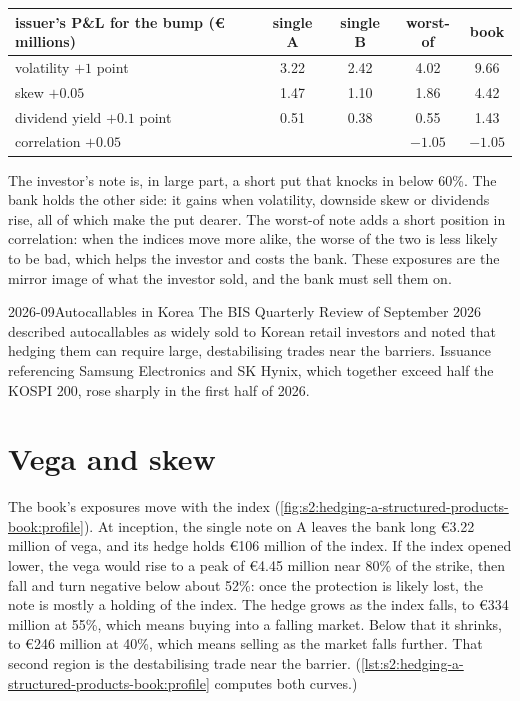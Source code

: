\begin{center}
\small
\begin{tabular}{@{}lcccc@{}}
\toprule
issuer's P\&L for the bump (\euro{} millions) & single A & single B & worst-of & book\\
\midrule
volatility $+1$ point & 3.22 & 2.42 & 4.02 & 9.66\\
skew $+0.05$ & 1.47 & 1.10 & 1.86 & 4.42\\
dividend yield $+0.1$ point & 0.51 & 0.38 & 0.55 & 1.43\\
correlation $+0.05$ & & & $-1.05$ & $-1.05$\\
\bottomrule
\end{tabular}
\end{center}

The investor's note is, in large part, a short put that knocks in below 60\%. The bank holds the other side: it gains when volatility, downside skew or
dividends rise, all of which make the put dearer. The worst-of note adds a short position in correlation: when the indices move more alike, the worse
of the two is less likely to be bad, which helps the investor and costs the bank. These exposures are the mirror image of what the investor sold, and
the bank must sell them on.

\begin{dated}{2026-09}{Autocallables in Korea}\label{dat:s2:hedging-a-structured-products-book:korea}
The BIS Quarterly Review of September 2026 described autocallables as widely sold to Korean retail investors and noted that hedging them can require
large, destabilising trades near the barriers. Issuance referencing Samsung Electronics and SK Hynix, which together exceed half the KOSPI 200, rose
sharply in the first half of 2026.
\end{dated}

\section{Vega and skew}

The book's exposures move with the index (\cref{fig:s2:hedging-a-structured-products-book:profile}). At inception, the single note on A leaves the bank
long \euro3.22 million of vega, and its hedge holds \euro106 million of the index. If the index opened lower, the vega would rise to a peak of \euro4.45
million near 80\% of the strike, then fall and turn negative below about 52\%: once the protection is likely lost, the note is mostly a holding of
the index. The hedge grows as the index falls, to \euro334 million at 55\%, which means buying into a falling market. Below that it shrinks, to
\euro246 million at 40\%, which means selling as the market falls further. That second region is the destabilising trade near the barrier.
(\cref{lst:s2:hedging-a-structured-products-book:profile} computes both curves.)

